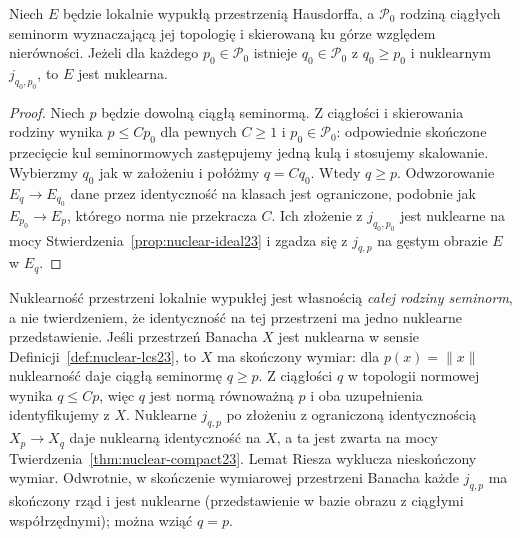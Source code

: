 \begin{lemat}
\label{lem:nuclear-cofinal23}
Niech $E$ będzie lokalnie wypukłą przestrzenią Hausdorffa,
a $\mathcal P_0$ rodziną ciągłych seminorm wyznaczającą
jej topologię i skierowaną ku górze względem nierówności.
Jeżeli dla każdego $p_0\in\mathcal P_0$ istnieje
$q_0\in\mathcal P_0$ z $q_0\ge p_0$ i nuklearnym
$j_{q_0,p_0}$, to $E$ jest nuklearna.
\end{lemat}
\begin{proof}
Niech $p$ będzie dowolną ciągłą seminormą. Z ciągłości
i skierowania rodziny wynika $p\le C p_0$ dla pewnych
$C\ge1$ i $p_0\in\mathcal P_0$: odpowiednie skończone
przecięcie kul seminormowych zastępujemy jedną kulą
i stosujemy skalowanie. Wybierzmy $q_0$ jak w założeniu
i połóżmy $q=Cq_0$. Wtedy $q\ge p$.
Odwzorowanie $E_q\to E_{q_0}$ dane przez identyczność
na klasach jest ograniczone, podobnie jak
$E_{p_0}\to E_p$, którego norma nie przekracza $C$.
Ich złożenie z $j_{q_0,p_0}$ jest nuklearne na mocy
Stwierdzenia~\ref{prop:nuclear-ideal23} i zgadza się
z $j_{q,p}$ na gęstym obrazie $E$ w $E_q$.
\end{proof}

\begin{uwaga}
\label{rem:nuclear-different23}
Nuklearność przestrzeni lokalnie wypukłej jest własnością
\emph{całej rodziny seminorm}, a nie twierdzeniem,
że identyczność na tej przestrzeni ma jedno nuklearne
przedstawienie. Jeśli przestrzeń Banacha $X$ jest nuklearna
w sensie Definicji~\ref{def:nuclear-lcs23}, to $X$
ma skończony wymiar: dla $p(x)=\|x\|$ nuklearność
daje ciągłą seminormę $q\ge p$. Z ciągłości $q$
w topologii normowej wynika $q\le Cp$, więc $q$
jest normą równoważną $p$ i oba uzupełnienia
identyfikujemy z $X$. Nuklearne $j_{q,p}$ po
złożeniu z ograniczoną identycznością $X_p\to X_q$
daje nuklearną identyczność na $X$, a ta jest zwarta
na mocy Twierdzenia~\ref{thm:nuclear-compact23}.
Lemat Riesza wyklucza nieskończony wymiar.
Odwrotnie, w skończenie wymiarowej przestrzeni Banacha
każde $j_{q,p}$ ma skończony rząd i jest nuklearne
(przedstawienie w bazie obrazu z ciągłymi współrzędnymi);
można wziąć $q=p$.
\end{uwaga}

